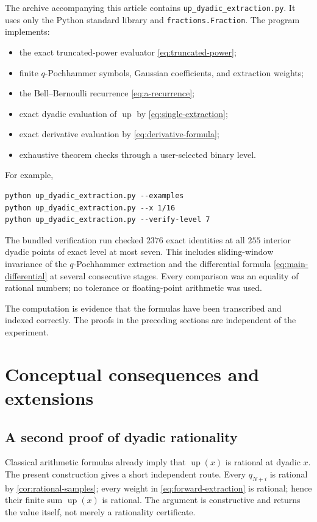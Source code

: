 \documentclass[11pt,oneside]{article}
\theoremstyle{definition}
\theoremstyle{remark}
\newcommand{\up}{\operatorname{up}}
\begin{document}
The archive accompanying this article contains
\texttt{up\_dyadic\_extraction.py}.  It uses only the Python standard library
and \texttt{fractions.Fraction}.  The program implements:
\begin{itemize}
 \item the exact truncated-power evaluator \eqref{eq:truncated-power};
 \item finite \(q\)-Pochhammer symbols, Gaussian coefficients, and extraction
 weights;
 \item the Bell--Bernoulli recurrence \eqref{eq:a-recurrence};
 \item exact dyadic evaluation of \(\up\) by \eqref{eq:single-extraction};
 \item exact derivative evaluation by \eqref{eq:derivative-formula};
 \item exhaustive theorem checks through a user-selected binary level.
\end{itemize}

For example,
\begin{lstlisting}[style=pythonstyle]
python up_dyadic_extraction.py --examples
python up_dyadic_extraction.py --x 1/16
python up_dyadic_extraction.py --verify-level 7
\end{lstlisting}
The bundled verification run checked \(2376\) exact identities at all \(255\)
interior dyadic points of exact level at most seven.  This includes sliding-window
invariance of the \(q\)-Pochhammer extraction and the differential formula
\eqref{eq:main-differential} at several consecutive stages.  Every comparison
was an equality of rational numbers; no tolerance or floating-point arithmetic
was used.

The computation is evidence that the formulas have been transcribed and
indexed correctly.  The proofs in the preceding sections are independent of
the experiment.

\section{Conceptual consequences and extensions}

\subsection{A second proof of dyadic rationality}

Classical arithmetic formulas already imply that \(\up(x)\) is rational at
dyadic \(x\).  The present construction gives a short independent route.
Every \(q_{N+i}\) is rational by \cref{cor:rational-samples}; every weight in
\eqref{eq:forward-extraction} is rational; hence their finite sum
\(\up(x)\) is rational.  The argument is constructive and returns the value
itself, not merely a rationality certificate.
\end{document}
